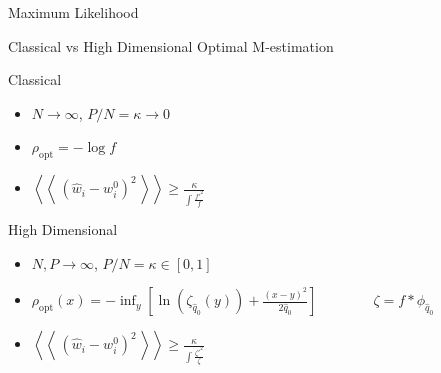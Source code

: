 \documentclass[pdf]{beamer}
\newcommand{\qav}[1]{\mbox{$\left\langle\left\langle \, #1 \, \right\rangle\right\rangle$}}
\newcommand{\ra}{\rightarrow}
\begin{document}
\begin{frame}{Maximum Likelihood}




\end{frame}










\begin{frame}[t]{Classical vs High Dimensional Optimal M-estimation}

    \begin{block}{Classical}
        \begin{itemize}
        \item $N\ra \infty$, $P/N =\kappa \ra 0$
        \vspace{.1in}
        \item $\rho_{\text{opt}} = -\log f$
        \vspace{.1in}
        \item $\qav{(\hat{w}_i-w^0_i)^2} \ge \frac{\kappa}{\int{\frac{f'^2}{f}}}$
        \vspace{.1in}
        \end{itemize}

    \end{block}


    \begin{block}{High Dimensional}
        \begin{itemize}
        \item $N,P\ra \infty$, $P/N =\kappa \in [0,1]$
        \vspace{.1in}
        \item $\rho_{\text{opt}}(x) = -\inf_y{\left[\ln(\zeta_{\hat{q}_0}(y))+\frac{(x-y)^2}{2 \hat{q}_0}\right]} \quad \quad \quad \quad \zeta = f*\phi_{\hat{q}_0}$
        \vspace{.1in}
        \item $\qav{(\hat{w}_i-w^0_i)^2} \ge \frac{\kappa}{\int{\frac{\zeta'^2}{\zeta}}}$
        \vspace{.1in}
        \end{itemize}
    \end{block}
\end{frame}
\end{document}
